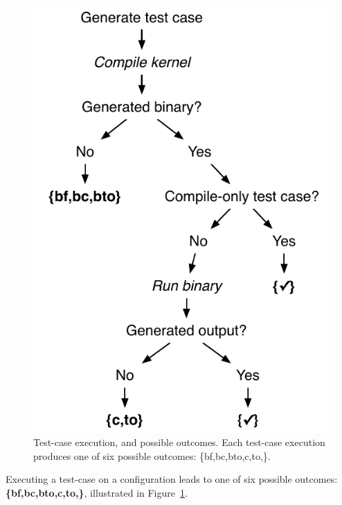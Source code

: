 \begin{figure}
	\centering %
	\includegraphics[width=.62\columnwidth]{img/test_process}%
	\caption{%
		Test-case execution, and possible outcomes. Each test-case execution produces one of six possible outcomes: \{bf,bc,bto,c,to,\cmark\}.%
	}%
	\label{fig:test-process} %
\end{figure}


Executing a test-case on a configuration leads to one of six possible outcomes: \textbf{\{bf,bc,bto,c,to,\cmark\}}, illustrated in Figure~\ref{fig:test-process}.

